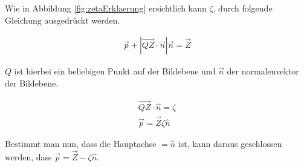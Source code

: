 Wie in Abbildung \ref{fig:zetaErklaerung} ersichtlich kann $\zeta$, durch folgende Gleichung ausgedrückt werden.

\begin{gather}
\vec{p}+|\vec{QZ} \cdot \vec{n}|\vec{n} = \vec{Z}
\end{gather}

$Q$ ist hierbei ein beliebigen Punkt auf der Bildebene und $\vec{n}$ der normalenvektor der Bildebene.

\begin{gather}
\vec{QZ} \cdot \hat{n} = \zeta\\
\vec{p}= \vec{Z}\zeta \hat{n}
\end{gather}

Bestimmt man nun, dass die Hauptachse $= \hat{n}$ ist, kann daraus geschlossen werden, dass $\vec{p} = \vec{Z} - \zeta \hat{n}$.


